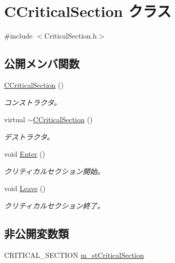 \hypertarget{class_c_critical_section}{}\section{C\+Critical\+Section クラス}
\label{class_c_critical_section}


{\ttfamily \#include $<$Critical\+Section.\+h$>$}

\subsection*{公開メンバ関数}
\begin{DoxyCompactItemize}
\item 
\hyperlink{class_c_critical_section_ac72884ebdba4c5f3a19fd0fd2e88eff9}{C\+Critical\+Section} ()
\begin{DoxyCompactList}\small\item\em コンストラクタ。 \end{DoxyCompactList}\item 
virtual \hyperlink{class_c_critical_section_a60ef2d8b504bcca10bdcc485fe6dc3bb}{$\sim$\+C\+Critical\+Section} ()
\begin{DoxyCompactList}\small\item\em デストラクタ。 \end{DoxyCompactList}\item 
void \hyperlink{class_c_critical_section_a7234a370d8ba3cfee12b39b899e817fa}{Enter} ()
\begin{DoxyCompactList}\small\item\em クリティカルセクション開始。 \end{DoxyCompactList}\item 
void \hyperlink{class_c_critical_section_a6e60879511af2f366c1f41f06d8af9d5}{Leave} ()
\begin{DoxyCompactList}\small\item\em クリティカルセクション終了。 \end{DoxyCompactList}\end{DoxyCompactItemize}
\subsection*{非公開変数類}
\begin{DoxyCompactItemize}
\item 
C\+R\+I\+T\+I\+C\+A\+L\+\_\+\+S\+E\+C\+T\+I\+O\+N \hyperlink{class_c_critical_section_a803df161d876cc6566c3c6a07673c572}{m\+\_\+st\+Critical\+Section}
\end{DoxyCompactItemize}


